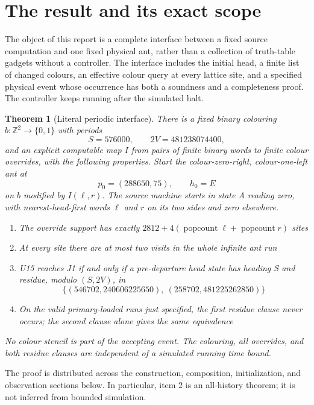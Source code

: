 \documentclass[11pt,letterpaper]{article}
\newtheorem{theorem}{Theorem}[section]
\theoremstyle{definition}\newtheorem{definition}[theorem]{Definition}
\theoremstyle{remark}\newtheorem{remark}[theorem]{Remark}
\newcommand{\Z}{\mathbb Z}\newcommand{\N}{\mathbb N}\newcommand{\Zp}{\mathbb Z_{>0}}
\newcommand{\pop}{\operatorname{popcount}}
\begin{document}
\section{The result and its exact scope}\label{ptr:la:sec:result}
The object of this report is a complete interface between a fixed source computation and one fixed physical ant, rather than a collection of truth-table gadgets without a controller. The interface includes the initial head, a finite list of changed colours, an effective colour query at every lattice site, and a specified physical event whose occurrence has both a soundness and a completeness proof. The controller keeps running after the simulated halt.

\begin{theorem}[Literal periodic interface]\label{ptr:la:thm:interface}
There is a fixed binary colouring $b:\Z^2\to\{0,1\}$ with periods
\[
 S=576000,\qquad 2V=481238074400,
\]
and an explicit computable map $I$ from pairs of finite binary words to finite colour overrides, with the following properties. Start the colour-zero-right, colour-one-left ant at
\[
 p_0=(288650,75),\qquad h_0=E
\]
on $b$ modified by $I(\ell,r)$. The source machine starts in state A reading zero, with nearest-head-first words $\ell$ and $r$ on its two sides and zero elsewhere.
\begin{enumerate}
\item The override support has exactly $2812+4(\pop\ell+\pop r)$ sites
\item At every site there are at most two visits in the whole infinite ant run
\item U15 reaches J1 if and only if a pre-departure head state has heading S and residue, modulo $(S,2V)$, in
\begin{equation}\label{ptr:la:eq:ports}
 \{(546702,240606225650),\ (258702,481225262850)\}
\end{equation}
\item On the valid primary-loaded runs just specified, the first residue clause never occurs; the second clause alone gives the same equivalence
\end{enumerate}
No colour stencil is part of the accepting event. The colouring, all overrides, and both residue clauses are independent of a simulated running time bound.
\end{theorem}
The proof is distributed across the construction, composition, initialization, and observation sections below. In particular, item 2 is an all-history theorem; it is not inferred from bounded simulation.
\end{document}

